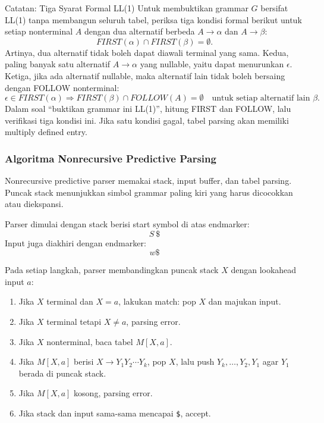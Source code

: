 \begin{cmt}{Catatan: Tiga Syarat Formal LL(1)}{}
Untuk membuktikan grammar $G$ bersifat LL(1) tanpa membangun seluruh tabel, periksa tiga kondisi formal berikut untuk setiap nonterminal $A$ dengan dua alternatif berbeda $A\rightarrow \alpha$ dan $A\rightarrow \beta$:
\[
    FIRST(\alpha)\cap FIRST(\beta)=\emptyset.
\]
Artinya, dua alternatif tidak boleh dapat diawali terminal yang sama. Kedua, paling banyak satu alternatif $A\rightarrow\alpha$ yang nullable, yaitu dapat menurunkan $\epsilon$. Ketiga, jika ada alternatif nullable, maka alternatif lain tidak boleh bersaing dengan FOLLOW nonterminal:
\[
    \epsilon\in FIRST(\alpha)
    \Rightarrow
    FIRST(\beta)\cap FOLLOW(A)=\emptyset
    \quad\text{untuk setiap alternatif lain }\beta.
\]
Dalam soal ``buktikan grammar ini LL(1)'', hitung FIRST dan FOLLOW, lalu verifikasi tiga kondisi ini. Jika satu kondisi gagal, tabel parsing akan memiliki multiply defined entry.
\end{cmt}

\subsubsection{Algoritma Nonrecursive Predictive Parsing}

\begin{jawab}
Nonrecursive predictive parser memakai stack, input buffer, dan tabel parsing. Puncak stack menunjukkan simbol grammar paling kiri yang harus dicocokkan atau diekspansi.
\end{jawab}

Parser dimulai dengan stack berisi start symbol di atas endmarker:
\[
    S\ \$
\]
Input juga diakhiri dengan endmarker:
\[
    w\$
\]

Pada setiap langkah, parser membandingkan puncak stack $X$ dengan lookahead input $a$:
\begin{enumerate}
    \item Jika $X$ terminal dan $X=a$, lakukan match: pop $X$ dan majukan input.
    \item Jika $X$ terminal tetapi $X\neq a$, parsing error.
    \item Jika $X$ nonterminal, baca tabel $M[X,a]$.
    \item Jika $M[X,a]$ berisi $X\rightarrow Y_1Y_2\cdots Y_k$, pop $X$, lalu push $Y_k,\ldots,Y_2,Y_1$ agar $Y_1$ berada di puncak stack.
    \item Jika $M[X,a]$ kosong, parsing error.
    \item Jika stack dan input sama-sama mencapai \texttt{\$}, accept.
\end{enumerate}

